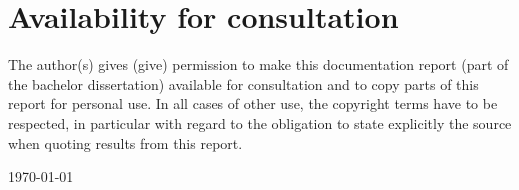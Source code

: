 \chapter*{Availability for consultation}

The author(s) gives (give) permission to make this documentation report (part of the bachelor dissertation) available for consultation and to copy parts of this report for personal use. In all cases of other use, the copyright terms have to be respected, in particular with regard to the obligation to state explicitly the source when quoting results from this report.

\vspace{12pt}

\today